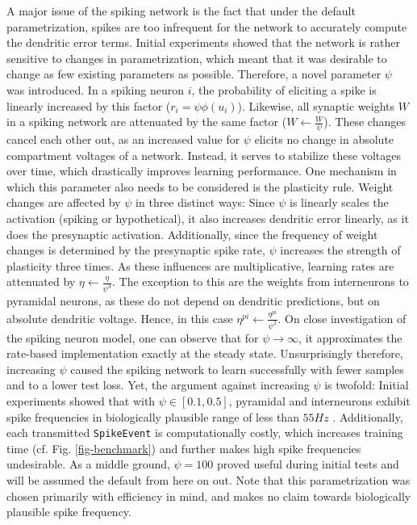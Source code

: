 A major issue of the spiking network is the fact that under the default parametrization, spikes are too infrequent for
the network to accurately compute the dendritic error terms. Initial experiments showed that the network is rather
sensitive to changes in parametrization, which meant that it was desirable to change as few existing parameters as
possible. Therefore, a novel parameter $\psi$ was introduced. In a spiking neuron $i$, the probability of eliciting a
spike is linearly increased by this factor ($r_i = \psi \phi(u_i)$). Likewise, all synaptic weights $W$ in a spiking
network are attenuated by the same factor ($W \leftarrow \frac{W}{\psi}$). These changes cancel each other out, as an
increased value for $\psi$ elicits no change in absolute compartment voltages of a network. Instead, it serves to
stabilize these voltages over time, which drastically improves learning performance. One mechanism in which this
parameter also needs to be considered is the plasticity rule. Weight changes are affected by $\psi$ in three distinct
ways: Since $\psi$ is linearly scales the activation (spiking or hypothetical), it also increases dendritic error
linearly, as it does the presynaptic activation. Additionally, since the frequency of weight changes is determined by
the presynaptic spike rate, $\psi$ increases the strength of plasticity three times. As these influences are
multiplicative, learning rates are attenuated by $\eta \leftarrow \frac{\eta}{\psi^3}$. The exception to this are the
weights from interneurons to pyramidal neurons, as these do not depend on dendritic predictions, but on absolute
dendritic voltage. Hence, in this case $\eta^{pi} \leftarrow\frac{\eta^{pi}}{\psi^2}$. On close investigation of the
spiking neuron model, one can observe that for $\psi \rightarrow \infty$, it approximates the rate-based implementation
exactly at the steady state. Unsurprisingly therefore, increasing $\psi$ caused the spiking network to learn
successfully with fewer samples and to a lower test loss. Yet, the argument against increasing $\psi$ is twofold:
Initial experiments showed that with $\psi \in [0.1, 0.5]$, pyramidal and interneurons exhibit spike frequencies in
biologically plausible range of less than $55Hz$ \cite{Kawaguchi2001,Eyal2018} . Additionally, each
transmitted \texttt{SpikeEvent} is computationally costly, which increases training time (cf. Fig.
\ref{fig-benchmark}) and further makes high spike frequencies undesirable. As a middle ground, $\psi = 100$ proved
useful during initial tests and will be assumed the default from here on out. Note that this parametrization was chosen
primarily with efficiency in mind, and makes no claim towards biologically plausible spike frequency.

